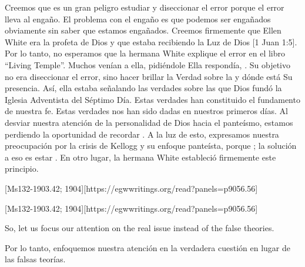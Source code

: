 Creemos que es un gran peligro estudiar y diseccionar el error porque el error lleva al engaño. El problema con el engaño es que podemos ser engañados obviamente sin saber que estamos engañados. Creemos firmemente que Ellen White era la profeta de Dios y que estaba recibiendo la Luz de Dios [1 Juan 1:5]. Por lo tanto, no esperamos que la hermana White explique el error en el libro “Living Temple”. Muchos venían a ella, pidiéndole  Ella respondía, . Su objetivo no era diseccionar el error, sino hacer brillar la Verdad sobre la  y dónde está Su presencia. Así, ella estaba señalando las verdades sobre las que Dios fundó la Iglesia Adventista del Séptimo Día. Estas verdades han constituido el fundamento de nuestra fe. Estas verdades nos han sido dadas en nuestros primeros días. Al desviar nuestra atención de la personalidad de Dios hacia el panteísmo, estamos perdiendo la oportunidad de recordar . A la luz de esto, expresamos nuestra preocupación por la crisis de Kellogg y su enfoque panteísta, porque ; la solución a eso es estar . En otro lugar, la hermana White estableció firmemente este principio.


[Ms132-1903.42; 1904][https://egwwritings.org/read?panels=p9056.56]


[Ms132-1903.42; 1904][https://egwwritings.org/read?panels=p9056.56]


So, let us focus our attention on the real issue instead of the false theories.


Por lo tanto, enfoquemos nuestra atención en la verdadera cuestión en lugar de las falsas teorías.





% 
